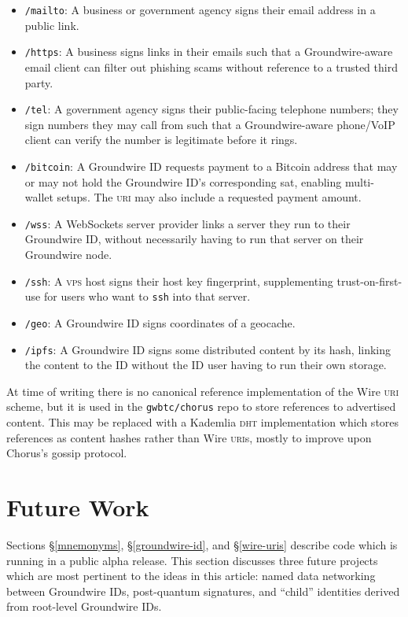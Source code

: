 \documentclass[twoside]{article}
\begin{document}
\begin{itemize}[noitemsep,topsep=2pt]

\item
  \texttt{/mailto}: A business or government agency signs their email
  address in a public link.
\item
  \texttt{/https}: A business signs links in their emails such that a
  Groundwire-aware email client can filter out phishing scams without
  reference to a trusted third party.
\item
  \texttt{/tel}: A government agency signs their public-facing telephone
  numbers; they sign numbers they may call from such that a
  Groundwire-aware phone/VoIP client can verify the number is
  legitimate before it rings.
\item
  \texttt{/bitcoin}: A Groundwire ID requests payment to a Bitcoin
  address that may or may not hold the Groundwire ID's corresponding
  sat, enabling multi-wallet setups. The \textsc{uri} may also include a
  requested payment amount.
\item
  \texttt{/wss}: A WebSockets server provider links a server they run to
  their Groundwire ID, without necessarily having to run that server on
  their Groundwire node.
\item
  \texttt{/ssh}: A \textsc{vps} host signs their host key fingerprint,
  supplementing trust-on-first-use for users who want to \texttt{ssh} into that
  server.
\item
  \texttt{/geo}: A Groundwire ID signs coordinates of a geocache.
\item
  \texttt{/ipfs}: A Groundwire ID signs some distributed content by its
  hash, linking the content to the ID without the ID user having to run
  their own storage.
\end{itemize}

At time of writing there is no canonical reference implementation of the
Wire \textsc{uri} scheme, but it is used in the \texttt{gwbtc/chorus} repo to
store references to advertised content. This may be replaced with a
Kademlia \textsc{dht} implementation which stores references as content hashes
rather than Wire \textsc{uri}s, mostly to improve upon Chorus's gossip protocol.

\section{Future Work}\label{future-work}

Sections \S\ref{mnemonyms}, \S\ref{groundwire-id}, and \S\ref{wire-uris} describe code which is running in a public alpha
release. This section discusses three future projects which are most
pertinent to the ideas in this article: named data networking between
Groundwire IDs, post-quantum signatures, and ``child'' identities
derived from root-level Groundwire IDs.
\end{document}
